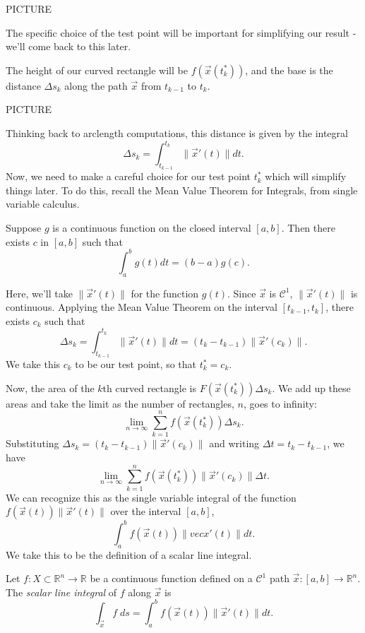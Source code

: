 \documentclass{ximera}
\begin{document}
PICTURE

The specific choice of the test point will be important for simplifying our result - we'll come back to this later.

The height of our curved rectangle will be $f(\vec{x}(t_k^*))$, and the base is the distance $\Delta s_k$ along the path $\vec{x}$ from $t_{k-1}$ to $t_k$.

PICTURE

Thinking back to arclength computations, this distance is given by the integral
\[
\Delta s_k = \int_{t_{k-1}}^{t_k}\|\vec{x}'(t)\|dt.
\]
Now, we need to make a careful choice for our test point $t_k^*$ which will simplify things later. To do this, recall the Mean Value Theorem for Integrals, from single variable calculus.

\begin{theorem}
Suppose $g$ is a continuous function on the closed interval $[a,b]$. Then there exists $c$ in $[a,b]$ such that
\[
\int_a^b g(t)dt = (b-a)g(c).
\]
\end{theorem}

Here, we'll take $\|\vec{x}'(t)\|$ for the function $g(t)$. Since $\vec{x}$ is $\mathcal{C}^1$, $\|\vec{x}'(t)\|$ is continuous. Applying the Mean Value Theorem on the interval $[t_{k-1}, t_k]$, there exists $c_k$ such that
\[
\Delta s_k = \int_{t_{k-1}}^{t_k}\|\vec{x}'(t)\|dt = (t_k-t_{k-1})\|\vec{x}'(c_k)\|.
\]
We take this $c_k$ to be our test point, so that $t_k^* = c_k$.

Now, the area of the $k$th curved rectangle is $F(\vec{x}(t_k^*))\Delta s_k$. We add up these areas and take the limit as the number of rectangles, $n$, goes to infinity:
\[
\lim_{n\rightarrow \infty} \sum_{k=1}^n f(\vec{x}(t_k^*))\Delta s_k.
\]
Substituting $\Delta s_k=(t_k-t_{k-1})\|\vec{x}'(c_k)\|$ and writing $\Delta t = t_k-t_{k-1}$, we have
\[
\lim_{n\rightarrow \infty} \sum_{k=1}^n f(\vec{x}(t_k^*))\|\vec{x}'(c_k)\|\Delta t.
\]
We can recognize this as the single variable integral of the function $f(\vec{x}(t))\|\vec{x}'(t)\|$ over the interval $[a,b]$,
\[
\int_a^b f(\vec{x}(t)) \|vec{x}'(t)\|dt.
\]
We take this to be the definition of a scalar line integral.

\begin{definition}
Let $f:X\subset \mathbb{R}^n\rightarrow\mathbb{R}$ be a continuous function defined on a $\mathcal{C}^1$ path $\vec{x}:[a,b]\rightarrow\mathbb{R}^n$. The \emph{scalar line integral} of $f$ along $\vec{x}$ is
\[
\int_{\vec{x}} f\;ds = \int_a^b f(\vec{x}(t))\|\vec{x}'(t)\|dt.
\]
\end{definition}
\end{document}
